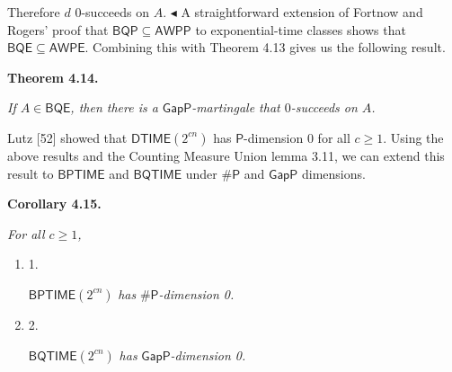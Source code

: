 \documentclass[10pt,a4paper]{article}
\begin{document}
Therefore $d$ $0$-succeeds on $A$.
$\blacktriangleleft$
A straightforward extension of Fortnow and Rogers’ proof that $\mathsf{BQP}\subseteq\mathsf{AWPP}$ to exponential-time classes shows that
$\mathsf{BQE}\subseteq\mathsf{AWPE}$.
Combining this with Theorem 4.13 gives us the following result.\par





\par\medskip\noindent\textbf{
\textbf{Theorem 4.14}\textbf{.}
}\par



\emph{If $A\in\mathsf{BQE}$, then there is a $\mathsf{GapP}$-martingale that $0$-succeeds on $A$.}\par






Lutz [52] showed that $\mathsf{DTIME}(2^{cn})$ has $\mathsf{P}$-dimension 0 for all $c\geq 1$.
Using the above results and the Counting Measure Union lemma 3.11, we can extend this result to $\mathsf{BPTIME}$ and $\mathsf{BQTIME}$ under ${\mathsf{\#}\mathsf{P}}$ and $\mathsf{GapP}$ dimensions.\par





\par\medskip\noindent\textbf{
\textbf{Corollary 4.15}\textbf{.}
}\par



\emph{For all $c\geq 1$,}\par


\begin{enumerate}


\item[] 
1. 


$\mathsf{BPTIME}(2^{cn})$\emph{ has }${\mathsf{\#}\mathsf{P}}$\emph{-dimension 0.}\par





\item[] 
2. 


$\mathsf{BQTIME}(2^{cn})$\emph{ has }$\mathsf{GapP}$\emph{-dimension 0.}\par





\end{enumerate}
\end{document}
